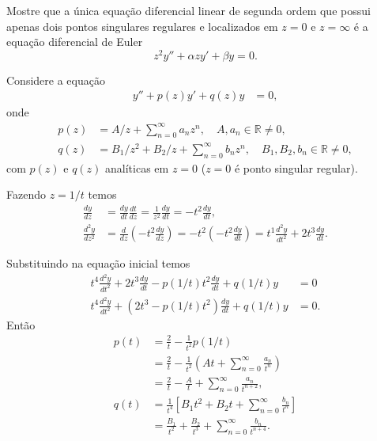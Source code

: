 \documentclass[a4paper,12pt, leqno, answers]{exam}
\begin{document}
\begin{questions}
    \question Mostre que a única equa\c{c}\~{a}o diferencial linear de segunda ordem que possui apenas dois pontos singulares regulares e localizados em $z = 0$ e $z = \infty$ \'{e} a equa\c{c}\~{a}o diferencial de Euler
    \[
    z^2 y'' + \alpha z y' + \beta y = 0.
    \]
    \begin{solution}
        Considere a equa\c{c}\~{a}o
        \begin{align*}
            y'' + p(z) y' + q(z) y &= 0,
        \end{align*}
        onde
        \begin{align*}
            p(z) &= A / z + \sum_{n = 0}^\infty a_n z^n, \quad A, a_n \in \mathbb{R} \neq 0, \\
            q(z) &= B_1 / z^2 + B_2 / z + \sum_{n = 0}^\infty b_n z^n, \quad B_1, B_2, b_n \in \mathbb{R} \neq 0,
        \end{align*}
        com $p(z)$ e $q(z)$ anal\'{i}ticas em $z = 0$ ($z = 0$ \'{e} ponto singular regular).

        Fazendo $z = 1 / t$ temos
        \begin{align*}
            \frac{d y}{d z} &= \frac{d y}{d t} \frac{d t}{d z} = \frac{1}{z^2} \frac{d y}{d t} = - t^2 \frac{d y}{d t}, \\
            \frac{d^2 y}{d z^2} &= \frac{d}{d z} \left( - t^2 \frac{d y}{d z} \right) = - t^2 \left( - t^2 \frac{d y}{d t} \right) = t^1 \frac{d^2 y}{d t^2} + 2 t^3 \frac{d y}{d t}.
        \end{align*}

        Substituindo na equa\c{c}\~{a}o inicial temos
        \begin{align*}
            t^4 \frac{d^2 y}{d t^2} + 2 t^3 \frac{d y}{d t} - p \left( 1 / t \right) t^2 \frac{d y}{d t} + q \left( 1 / t \right) y &= 0 \\
            t^4 \frac{d^2 y}{d t^2} + \left( 2 t^3 - p \left( 1 / t \right) t^2 \right) \frac{d y}{d t} + q \left( 1 / t \right) y &= 0.
        \end{align*}
        Ent\~{a}o
        \begin{align*}
            p(t) &= \frac{2}{t} - \frac{1}{t^2} p \left( 1 / t \right) \\
            &= \frac{2}{t} - \frac{1}{t^2} \left( A t + \sum_{n = 0}^\infty \frac{a_n}{t^n} \right) \\
            &= \frac{2}{t} - \frac{A}{t} + \sum_{n = 0}^\infty \frac{a_n}{t^{n + 2}}, \\
            q(t) &= \frac{1}{t^4} \left[ B_1 t^2 + B_2 t + \sum_{n = 0}^\infty \frac{b_n}{t^n} \right] \\
            &= \frac{B_1}{t^2} + \frac{B_2}{t^3} + \sum_{n = 0}^\infty \frac{b_n}{t^{n + 4}}.
        \end{align*}


\end{solution}
\end{questions}
\end{document}
